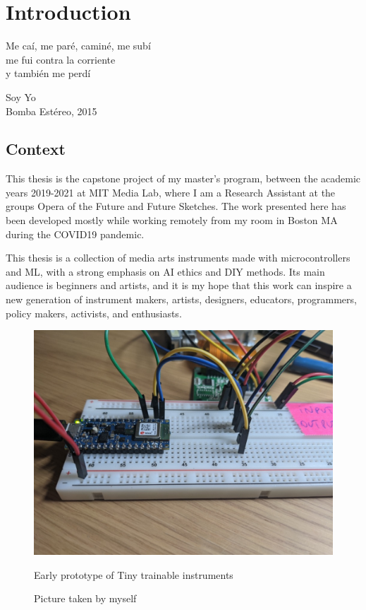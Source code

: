 \chapter{Introduction}

\epigraph{Me caí, me paré, caminé, me subí \\ me fui contra la corriente \\ y también me perdí}{Soy Yo \\ Bomba Estéreo, 2015}

\section{Context}

This thesis is the capstone project of my master's program, between the academic years 2019-2021 at MIT Media Lab, where I am a Research Assistant at the groups Opera of the Future and Future Sketches. The work presented here has been developed mostly while working remotely from my room in Boston MA during the COVID19 pandemic.

This thesis is a collection of media arts instruments made with microcontrollers and \acrfull{ML}, with a strong emphasis on \acrfull{AI} ethics and \acrfull{DIY} methods. Its main audience is beginners and artists, and it is my hope that this work can inspire a new generation of instrument makers, artists, designers, educators, programmers, policy makers, activists, and enthusiasts.

\begin{figure}[ht]
  \centering
  \includegraphics[width=0.75\linewidth,height=0.25\textheight,keepaspectratio]{images/tiny-trainable-instruments-early-protoype.jpg}
  \caption{Early prototype of Tiny trainable instruments}
  \caption*{Picture taken by myself}
  \label{fig:tiny-trainable-instruments-early-protoype}
\end{figure}

